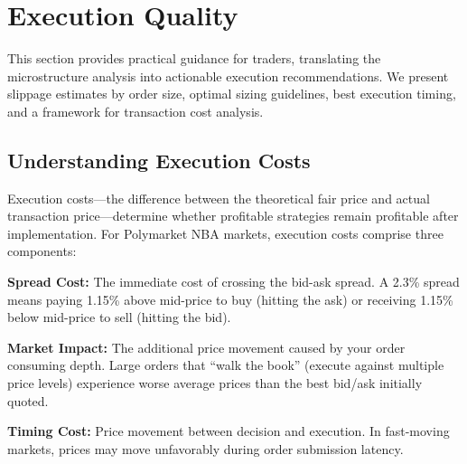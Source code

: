 
\chapter{Execution Quality}
\label{sec:execution}

This section provides practical guidance for traders, translating the microstructure analysis into actionable execution recommendations. We present slippage estimates by order size, optimal sizing guidelines, best execution timing, and a framework for transaction cost analysis.

\section{Understanding Execution Costs}

Execution costs---the difference between the theoretical fair price and actual transaction price---determine whether profitable strategies remain profitable after implementation. For Polymarket NBA markets, execution costs comprise three components:

\textbf{Spread Cost:} The immediate cost of crossing the bid-ask spread. A 2.3\% spread means paying 1.15\% above mid-price to buy (hitting the ask) or receiving 1.15\% below mid-price to sell (hitting the bid).

\textbf{Market Impact:} The additional price movement caused by your order consuming depth. Large orders that ``walk the book'' (execute against multiple price levels) experience worse average prices than the best bid/ask initially quoted.

\textbf{Timing Cost:} Price movement between decision and execution. In fast-moving markets, prices may move unfavorably during order submission latency.

